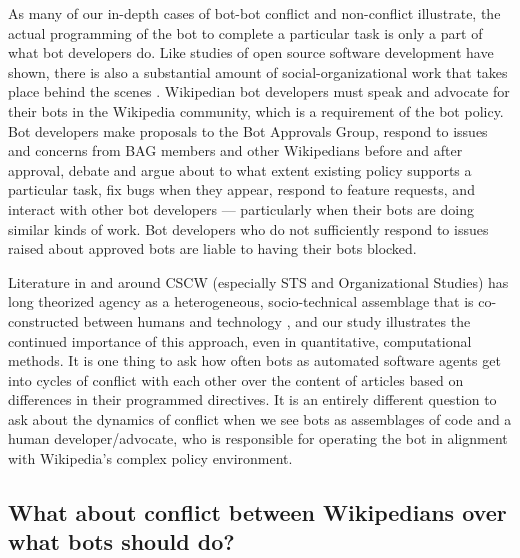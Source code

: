 \documentclass[format=acmsmall, review=false, screen=true]{acmart}%
\begin{document}
As many of our in-depth cases of bot-bot conflict and non-conflict illustrate, the actual programming of the bot to complete a particular task is only a part of what bot developers do. Like studies of open source software development have shown, there is also a substantial amount of social-organizational work that takes place behind the scenes \cite{Filippova2016,dabbish2013}. Wikipedian bot developers must speak and advocate for their bots in the Wikipedia community, which is a requirement of the bot policy. Bot developers make proposals to the Bot Approvals Group, respond to issues and concerns from BAG members and other Wikipedians before and after approval, debate and argue about to what extent existing policy supports a particular task, fix bugs when they appear, respond to feature requests, and interact with other bot developers --- particularly when their bots are doing similar kinds of work. Bot developers who do not sufficiently respond to issues raised about approved bots are liable to having their bots blocked.

Literature in and around CSCW (especially STS and Organizational Studies) has long theorized agency as a heterogeneous, socio-technical assemblage that is co-constructed between humans and technology \cite{Orlikowski1992,Bowker1999,Callon1986}, and our study illustrates the continued importance of this approach, even in quantitative, computational methods. It is one thing to ask how often bots as automated software agents get into cycles of conflict with each other over the content of articles based on differences in their programmed directives. It is an entirely different question to ask about the dynamics of conflict when we see bots as assemblages of code and a human developer/advocate, who is responsible for operating the bot in alignment with Wikipedia's complex policy environment.

\subsection{What about conflict between Wikipedians over what bots should do?} \label{s:s}
\end{document}
